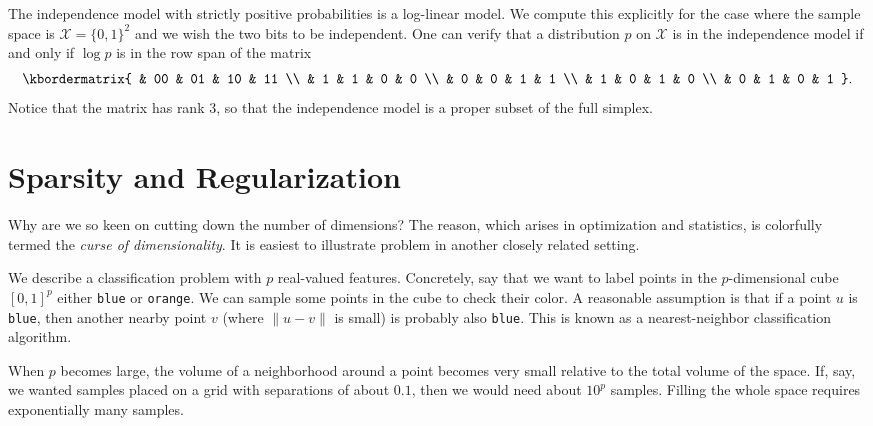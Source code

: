 \documentclass[cclicense]{hmcthesis}
\providecommand*{\xs}{\mathcal X}
\numberwithin{equation}{chapter}
\numberwithin{thmcounter}{chapter}
\begin{document}
    \begin{example}
        The independence model with strictly positive probabilities is a
        log-linear model.  We compute this explicitly for the case where the
        sample space is $\xs = \{0, 1\}^2$ and we wish the two bits to be
        independent.  One can verify that a distribution $p$ on $\xs$ is in the
        independence model if and only if $\log p$ is in the row span of the
        matrix
        \[
            \kbordermatrix{
                & 00 & 01 & 10 & 11 \\
                &  1 &  1 &  0 &  0 \\
                &  0 &  0 &  1 &  1 \\
                &  1 &  0 &  1 &  0 \\
                &  0 &  1 &  0 &  1
            }.
        \]
        Notice that the matrix has rank 3, so that the independence model is a
        proper subset of the full simplex.
    \end{example}

\section{Sparsity and Regularization}

    Why are we so keen on cutting down the number of dimensions?  The reason,
    which arises in optimization and statistics, is colorfully termed the \emph{curse
    of dimensionality}.  It is easiest to illustrate problem in another closely
    related setting.

    \begin{example}
        We describe a classification problem with $p$ real-valued features.
        Concretely, say that we want to label points in the $p$-dimensional cube
        $[0, 1]^p$ either \texttt{blue} or \texttt{orange}.  We can sample some
        points in the cube to check their color.  A reasonable assumption is
        that if a point $u$ is \texttt{blue}, then another nearby point $v$
        (where $\|u - v\|$ is small) is probably also \texttt{blue}.  This is
        known as a nearest-neighbor classification algorithm.  
        
        When $p$ becomes large, the volume of a neighborhood around a point
        becomes very small relative to the total volume of the space.  If, say,
        we wanted samples placed on a grid with separations of about $0.1$, then
        we would need about $10^p$ samples.  Filling the whole space requires
        exponentially many samples.
    \end{example}
\end{document}
